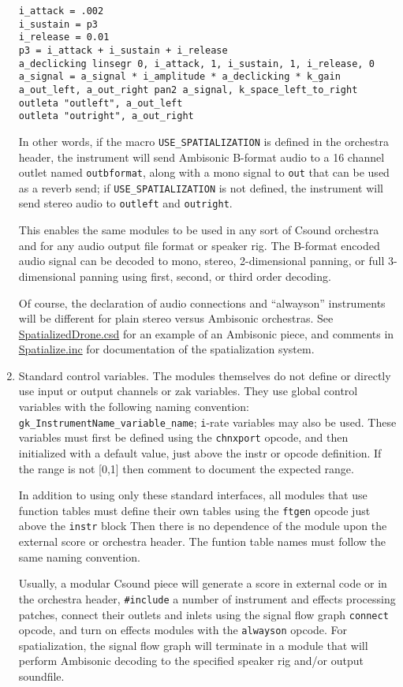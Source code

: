 \documentclass[12pt,letterpaper,onecolumn]{scrartcl}
\begin{document}
\begin{enumerate}
\begin{lstlisting}
i_attack = .002
i_sustain = p3
i_release = 0.01
p3 = i_attack + i_sustain + i_release
a_declicking linsegr 0, i_attack, 1, i_sustain, 1, i_release, 0
a_signal = a_signal * i_amplitude * a_declicking * k_gain
a_out_left, a_out_right pan2 a_signal, k_space_left_to_right
outleta "outleft", a_out_left
outleta "outright", a_out_right
\end{lstlisting}

\noindent In other words, if the macro \texttt{USE\_SPATIALIZATION} is defined
in the orchestra header, the instrument will send Ambisonic B-format audio to
a 16 channel outlet named \texttt{outbformat}, along with a mono signal to
\texttt{out} that can be used as a reverb send; if
\texttt{USE\_SPATIALIZATION}
is not defined, the instrument will send stereo audio to \texttt{outleft}
and \texttt{outright}.

This enables the same modules to be used in any sort of Csound
orchestra and for any audio output file format or speaker rig. The B-format
encoded audio signal can be decoded to mono, stereo, 2-dimensional panning, or
full 3-dimensional panning using first, second, or third order decoding.

Of course, the declaration of audio connections and ``alwayson'' instruments
will be different for plain stereo versus Ambisonic orchestras. See
\url{SpatializedDrone.csd} for an example of an Ambisonic piece, and comments
in \url{Spatialize.inc} for documentation of the spatialization system.

		\item Standard control variables. The modules themselves do not define
		or directly use input or output channels or zak variables. They use
global control variables with the following naming convention:
\texttt{gk\_InstrumentName\_variable\_name}; \texttt{i}-rate variables may also
be used. These variables must first be defined using the \texttt{chnxport} opcode, 
and then initialized with a default value, just above the instr or opcode
definition. If the range is not [0,1] then comment to document the expected range.

In addition to using only these standard interfaces, all modules that use
function tables must define their own tables using the
\texttt{ftgen} opcode just above the \texttt{instr} block Then there is no dependence 
of the module upon the external score or orchestra header. The funtion table names 
must follow the same naming convention.

Usually, a modular Csound piece will generate a score in external code or in
the orchestra header, \texttt{\#include} a number of instrument and effects
processing patches, connect their outlets and inlets using the signal flow
graph \texttt{connect} opcode, and turn on effects modules with the
\texttt{alwayson} opcode. For spatialization, the signal flow graph will
terminate in a module that will perform Ambisonic decoding to the specified
speaker rig and/or output soundfile.


\end{enumerate}
\end{document}
